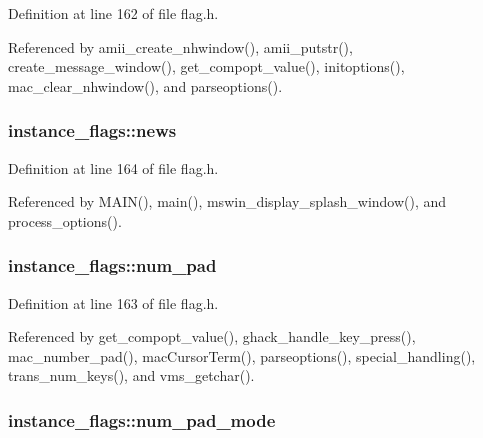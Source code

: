 Definition at line 162 of file flag.\+h.



Referenced by amii\+\_\+create\+\_\+nhwindow(), amii\+\_\+putstr(), create\+\_\+message\+\_\+window(), get\+\_\+compopt\+\_\+value(), initoptions(), mac\+\_\+clear\+\_\+nhwindow(), and parseoptions().

\hypertarget{structinstance__flags_a65a361ffd2534ddff433ba62f3dfb579}{
\subsubsection[{news}]{ instance\+\_\+flags\+::news}}\label{structinstance__flags_a65a361ffd2534ddff433ba62f3dfb579}


Definition at line 164 of file flag.\+h.



Referenced by M\+A\+I\+N(), main(), mswin\+\_\+display\+\_\+splash\+\_\+window(), and process\+\_\+options().

\hypertarget{structinstance__flags_abf8ead01634763341598a10bd5052f7e}{
\subsubsection[{num\+\_\+pad}]{ instance\+\_\+flags\+::num\+\_\+pad}}\label{structinstance__flags_abf8ead01634763341598a10bd5052f7e}


Definition at line 163 of file flag.\+h.



Referenced by get\+\_\+compopt\+\_\+value(), ghack\+\_\+handle\+\_\+key\+\_\+press(), mac\+\_\+number\+\_\+pad(), mac\+Cursor\+Term(), parseoptions(), special\+\_\+handling(), trans\+\_\+num\+\_\+keys(), and vms\+\_\+getchar().

\hypertarget{structinstance__flags_a009e6038e0b10c3f6371b0eca8740ab7}{
\subsubsection[{num\+\_\+pad\+\_\+mode}]{ instance\+\_\+flags\+::num\+\_\+pad\+\_\+mode}}\label{structinstance__flags_a009e6038e0b10c3f6371b0eca8740ab7}


